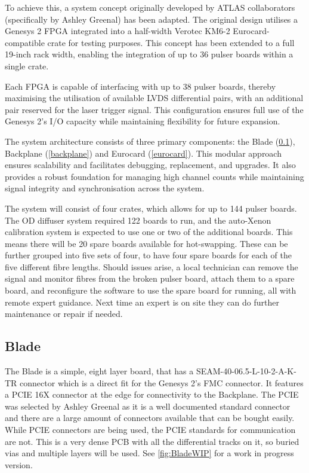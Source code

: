 \documentclass[a4paper,11pt]{article}
\begin{document}
To achieve this, a system concept originally developed by ATLAS collaborators (specifically by Ashley Greenal) has been adapted. The original design utilises a Genesys 2 FPGA integrated into a half-width Verotec KM6-2 \cite{KM6-2} Eurocard-compatible crate for testing purposes. This concept has been extended to a full 19-inch rack width, enabling the integration of up to 36 pulser boards within a single crate.

Each FPGA is capable of interfacing with up to 38 pulser boards, thereby maximising the utilisation of available LVDS differential pairs, with an additional pair reserved for the laser trigger signal. This configuration ensures full use of the Genesys 2’s I/O capacity while maintaining flexibility for future expansion.

The system architecture consists of three primary components: the Blade (\cref{blade}), Backplane (\cref{backplane}) and Eurocard (\cref{eurocard}). This modular approach ensures scalability and facilitates debugging, replacement, and upgrades. It also provides a robust foundation for managing high channel counts while maintaining signal integrity and synchronisation across the system.

The system will consist of four crates, which allows for up to 144 pulser boards. The OD diffuser system required 122 boards to run, and the auto-Xenon calibration system is expected to use one or two of the additional boards. This means there will be 20 spare boards available for hot-swapping. These can be further grouped into five sets of four, to have four spare boards for each of the five different fibre lengths. Should issues arise, a local technician can remove the signal and monitor fibres from the broken pulser board, attach them to a spare board, and reconfigure the software to use the spare board for running, all with remote expert guidance. Next time an expert is on site they can do further maintenance or repair if needed.

\subsection{Blade}\label{blade}

The Blade is a simple, eight layer board, that has a SEAM-40-06.5-L-10-2-A-K-TR \cite{SamtecSeam} connector which is a direct fit for the Genesys 2's FMC connector. It features a PCIE 16X connector at the edge for connectivity to the Backplane. The PCIE was selected by Ashley Greenal as it is a well documented standard connector and there are a large amount of connectors available that can be bought easily. While PCIE connectors are being used, the PCIE standards for communication are not. This is a very dense PCB with all the differential tracks on it, so buried vias and multiple layers will be used. See \cref{fig:BladeWIP} for a work in progress version.
\end{document}
